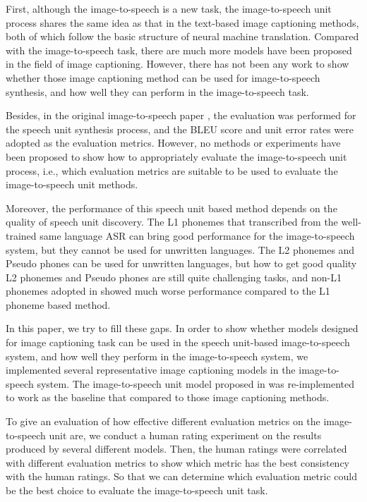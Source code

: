 \documentclass[journal,comsoc]{IEEEtran}
\begin{document}
First, although the image-to-speech is a new task, the image-to-speech unit process shares the same idea as that in the text-based image captioning methods, both of which follow the basic structure of neural machine translation. Compared with the image-to-speech task, there are much more models have been proposed in the field of image captioning. However, there has not been any work to show whether those image captioning method can be used for image-to-speech synthesis, and how well they can perform in the image-to-speech task.

Besides, in the original image-to-speech paper \cite{hasegawa2017image2speech}, the evaluation was performed for the speech unit synthesis process, and the BLEU score and unit error rates were adopted as the evaluation metrics. However, no methods or experiments have been proposed to show how to appropriately evaluate the image-to-speech unit process, i.e., which evaluation metrics are suitable to be used to evaluate the image-to-speech unit methods.

Moreover, the performance of this speech unit based method depends on the quality of speech unit discovery. The L1 phonemes that transcribed from the well-trained same language ASR can bring good performance for the image-to-speech system, but they cannot be used for unwritten languages. The L2 phonemes and Pseudo phones can be used for unwritten languages, but how to get good quality L2 phonemes and Pseudo phones are still quite challenging tasks, and non-L1 phonemes adopted in \cite{hasegawa2017image2speech} showed much worse performance compared to the L1 phoneme based method. 

In this paper, we try to fill these gaps. In order to show whether models designed for image captioning task can be used in the speech unit-based image-to-speech system, and how well they perform in the image-to-speech system, we implemented several representative image captioning models in the image-to-speech system. The image-to-speech unit model proposed in \cite{hasegawa2017image2speech} was re-implemented to work as the baseline that compared to those image captioning methods.

To give an evaluation of how effective different evaluation metrics on the image-to-speech unit are, we conduct a human rating experiment on the results produced by several different models. Then, the human ratings were correlated with different evaluation metrics to show which metric has the best consistency with the human ratings. So that we can determine which evaluation metric could be the best choice to evaluate the image-to-speech unit task.
\end{document}
